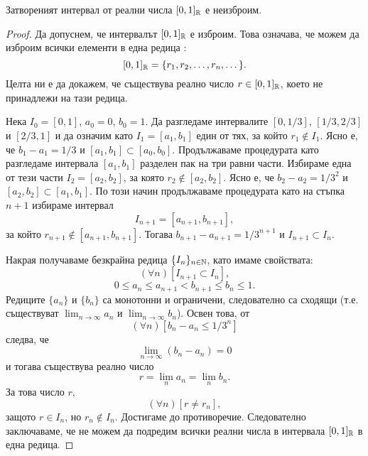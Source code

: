 \begin{framed}
  \begin{thm}[Кантор]
    Затвореният интервал от реални числа $[0,1]_{\mathbb{R}}$ е неизброим.
  \end{thm}
\end{framed}
\begin{proof}
  Да допуснем, че интервалът $[0,1]_{\mathbb{R}}$ е изброим. 
  Това означава, че можем да изброим всички елементи в една редица :
  \[[0,1]_{\mathbb{R}} = \{r_1,r_2,\dots,r_n,\dots\}.\]
  Целта ни е да докажем, че съществува реално число $r \in [0,1]_{\mathbb{R}}$,
  което не принадлежи на тази редица.

  Нека $I_0 = [0, 1]$, $a_0 = 0$, $b_0 = 1$.
  Да разгледаме интервалите $[0,1/3]$, $[1/3,2/3]$ и $[2/3,1]$ 
  и да означим като $I_1 = [a_1,b_1]$ един от тях, за който $r_1 \not\in I_1$.
  Ясно е, че $b_1-a_1 = 1/3$ и $[a_1,b_1] \subset [a_0,b_0]$.
  Продължаваме процедурата като разгледаме интервала $[a_1,b_1]$ разделен пак на три равни части.
  Избираме една от тези части $I_2 = [a_2,b_2]$, за която $r_2 \not\in [a_2,b_2]$.
  Ясно е, че $b_2-a_2 = 1/3^2$ и $[a_2,b_2] \subset [a_1,b_1]$.
  По този начин продължаваме процедурата като на стъпка $n+1$ 
  избираме интервал 
  \[I_{n+1} = [a_{n+1},b_{n+1}],\] за който $r_{n+1} \not\in [a_{n+1},b_{n+1}]$.
  Тогава $b_{n+1}-a_{n+1} = 1/3^{n+1}$ и $I_{n+1} \subset I_n$.

  Накрая получаваме безкрайна редица $\{I_n\}_{n\in\mathbb{N}}$, като имаме свойствата:
  \[(\forall n)[I_{n+1}\subset I_n],\]
  \[0\leq a_n \leq a_{n+1} < b_{n+1} \leq b_n \leq 1.\]
  Редиците $\{a_n\}$ и $\{b_n\}$ са монотонни и ограничени, следователно са сходящи 
  (т.е. съществуват $\lim_{n\to\infty} a_n$ и $\lim_{n\to\infty} b_n$).
  Освен това, от \[(\forall n)[b_n-a_n \leq 1/3^n]\] следва, че 
  \[\lim_{n\to\infty}(b_n-a_n) = 0\] и тогава съществува реално число 
  \[r = \lim_n a_n = \lim_n b_n.\]
  За това число $r$,
  \[(\forall n)[r \neq r_n],\]
  защото $r \in I_n$, но $r_n \not\in I_n$.
  Достигаме до противоречие.
  Следователно заключаваме, че не можем да подредим всички реални числа в интервала $[0,1]_{\mathbb{R}}$
  в една редица.
\end{proof}

